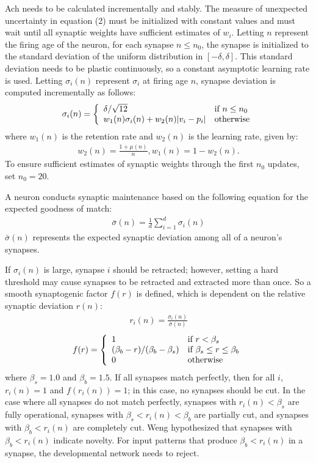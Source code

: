 \documentclass[conference]{IEEEtran}
\begin{document}
Ach needs to be calculated incrementally and stably. The measure of unexpected uncertainty in equation (2) must be initialized with constant values and must wait until all synaptic weights have sufficient estimates of $w_i$. Letting $n$ represent the firing age of the neuron, for each synapse $n \le n_0$, the synapse is initialized to the standard deviation of the uniform distribution in $[-\delta,\delta]$. This standard deviation needs to be plastic continuously, so a constant asymptotic learning rate is used. Letting $\sigma_i(n)$ represent $\sigma_i$ at firing age $n$, synapse deviation is computed incrementally as follows:
\begin{align}\sigma_i(n)=\left\{
\begin{array}{l l}
\delta/\sqrt{12} &\text{if $n \le n_0$}\\
w_1(n)\sigma_i(n)+w_2(n)|v_i-p_i| & \text{otherwise}
\end{array}\right.\end{align}
where $w_1(n)$ is the retention rate and $w_2(n)$ is the learning rate, given by:
\begin{align}w_2(n)=\frac{1+\mu(n)}{n},w_1(n)=1-w_2(n). \nonumber \end{align}
To ensure sufficient estimates of synaptic weights through the first $n_0$ updates, set $n_0=20$. 

A neuron conducts synaptic maintenance based on the following equation for the expected goodness of match:
\begin{align}\bar{\sigma}(n)=\frac{1}{d}\sum_{i=1}^d\sigma_i(n)\end{align}
$\bar{\sigma}(n)$ represents the expected synaptic deviation among all of a neuron's synapses.

If $\sigma_i(n)$ is large, synapse $i$ should be retracted; however, setting a hard threshold may cause synapses to be retracted and extracted more than once. So a smooth synaptogenic factor $f(r)$ is defined, which is dependent on the relative synaptic deviation $r(n)$:
\begin{align}r_i(n)=\frac{\sigma_i(n)}{\bar{\sigma}(n)}\end{align}
\begin{align}
f(r)=\left\{
\begin{array}{l l}
1 & \text{if $r < \beta_s$} \\
(\beta_b-r)/(\beta_b-\beta_s) & \text{if $\beta_s \le r \le \beta_b$} \\
0 & \text{otherwise}
\end{array}\right.\end{align}
where $\beta_s=1.0$ and $\beta_b=1.5$. If all synapses match perfectly, then for all $i$, $r_i(n)=1$ and $f(r_i(n))=1$; in this case, no synapses should be cut. In the case where all synapses do not match perfectly, synapses with $r_i(n) < \beta_s$ are fully operational, synapses with $\beta_s < r_i(n) < \beta_b$ are partially cut, and synapses with $\beta_b < r_i(n)$ are completely cut. Weng \cite{cit:2} hypothesized that synapses with $\beta_b < r_i(n)$ indicate novelty. For input patterns that produce $\beta_b < r_i(n)$ in a synapse, the developmental network needs to reject.
\end{document}
